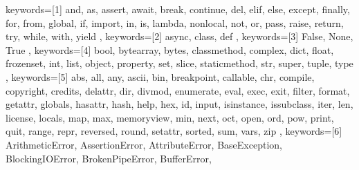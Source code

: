 {    %
    keywords=[1]{%
        and,
        as,
        assert,
        await,
        break,
        continue,
        del,
        elif,
        else,
        except,
        finally,
        for,
        from,
        global,
        if,
        import,
        in,
        is,
        lambda,
        nonlocal,
        not,
        or,
        pass,
        raise,
        return,
        try,
        while,
        with,
        yield%
    },
    keywords=[2]{%
        async,
        class,
        def%
    },
    keywords=[3]{%
        False,
        None,
        True%
    },
    keywords=[4]{%
        bool,
        bytearray,
        bytes,
        classmethod,
        complex,
        dict,
        float,
        frozenset,
        int,
        list,
        object,
        property,
        set,
        slice,
        staticmethod,
        str,
        super,
        tuple,
        type%
    },
    keywords=[5]{%
        abs,
        all,
        any,
        ascii,
        bin,
        breakpoint,
        callable,
        chr,
        compile,
        copyright,
        credits,
        delattr,
        dir,
        divmod,
        enumerate,%
        eval,
        exec,
        exit,
        filter,%
        format,
        getattr,
        globals,
        hasattr,
        hash,
        help,
        hex,
        id,
        input,
        isinstance,
        issubclass,
        iter,
        len,
        license,
        locals,
        map,%
        max,
        memoryview,%
        min,
        next,
        oct,
        open,
        ord,
        pow,
        print,
        quit,
        range,%
        repr,
        reversed,%
        round,
        setattr,
        sorted,
        sum,
        vars,
        zip%
    },
    keywords=[6]{%
        ArithmeticError,
        AssertionError,
        AttributeError,
        BaseException,
        BlockingIOError,
        BrokenPipeError,
        BufferError,
}}
